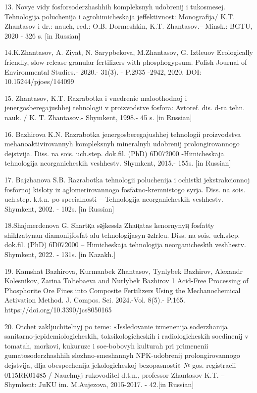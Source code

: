 13. Novye vidy fosforsoderzhashhih kompleksnyh udobrenij i tukosmesej.
Tehnologija poluchenija i agrohimicheskaja
jeffektivnost\textquotesingle: Monografija/ K.T. Zhantasov i dr.: nauch,
red.: O.B. Dormeshkin, K.T. Zhantasov.-- Minsk.: BGTU, 2020 - 326 s.
{[}in Russian{]}

14.K.Zhantasov, A. Ziyat, N. Sarypbekova, M.Zhantasov, G. Iztleuov
Ecologically friendly, slow-release granular fertilizers with
phosphogypsum. Polish Journal of Environmental Studies\emph{.-} 2020.-
31(3). - P.2935 -2942, 2020. DOI: 10.15244/pjoes/144099

15. Zhantasov, K.T. Razrabotka i vnedrenie maloothodnoj i
jenergosberegajushhej tehnologii v proizvodstve fosfora: Avtoref. dis.
d-ra tehn. nauk. / K. T. Zhantasov.- Shymkent, 1998.- 45 s. {[}in
Russian{]}

16. Bazhirova K.N. Razrabotka jenergosberegajushhej tehnologii
proizvodstva mehanoaktivirovannyh kompleksnyh
mineral\textquotesingle nyh udobrenij prolongirovannogo dejstvija. Diss.
na sois. uch.step. dok.fil. (PhD) 6D072000 -Himicheskaja tehnologija
neorganicheskih veshhestv. Shymkent, 2015.- 155s. {[}in Russian{]}

17. Bajzhanova S.B. Razrabotka tehnologii poluchenija i ochistki
jekstrakcionnoj fosfornoj kisloty iz aglomerirovannogo
fosfatno-kremnistogo syr\textquotesingle ja. Diss. na sois. uch.step.
k.t.n. po special\textquotesingle nosti -- Tehnologija neorganicheskih
veshhestv. Shymkent, 2002. - 102s. {[}in Russian{]}

18.Shajmerdenova G. Shartқa sәjkessіz Zhaңatas kenornynyң fosfatty
shikіzatynan diamonijfosfat alu tehnologijasyn әzіrleu. Diss. na sois.
uch.step. dok.fil. (PhD) 6D072000 -- Himicheskaja tehnologija
neorganicheskih veshhestv. Shymkent, 2022. - 131s. {[}in Kazakh.{]}

19. Kamshat Bazhirova, Kurmanbek Zhantasov, Tynlybek Bazhirov, Alexandr
Kolesnikov, Zarina Toltebaeva and Nurlybek Bazhirov 1 Acid-Free
Processing of Phosphorite Ore Fines into Composite Fertilizers Using the
Mechanochemical Activation Method. J. Compos. Sci. 2024.-Vol. 8(5).-
P.165. https://doi.org/10.3390/jcs8050165

20. Otchet zakljuchitel\textquotesingle nyj po teme: «Issledovanie
izmenenija soderzhanija sanitarno-jepidemiologicheskih,
toksikologicheskih i radiologicheskih soedinenij v tomatah, morkovi,
kukuruze i soe-bobovyh kul\textquotesingle turah pri primenenii
gumatosoderzhashhih slozhno-smeshannyh NPK-udobrenij prolongirovannogo
dejstvija, dlja obespechenija jekologicheskoj bezopasnosti» № gos.
registracii 0115RK01485 / Nauchnyj rukovoditel\textquotesingle{} d.t.n.,
professor Zhantasov K.T. -- Shymkent: JuKU im. M.Aujezova, 2015-2017. -
42.{[}in Russian{]}

